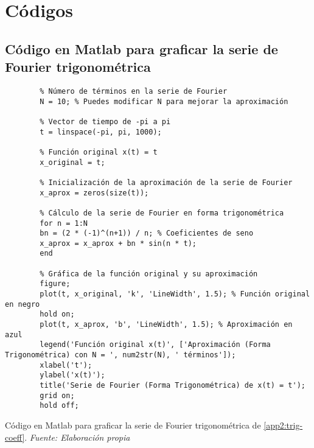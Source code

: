 \chapter{Códigos}\label{app3:Estado-del-arte-codes}

\section{Código en Matlab para graficar la serie de Fourier trigonométrica}\label{app3:trig-code-matlab}
\begin{longlisting}
	\begin{verbatim}
		% Número de términos en la serie de Fourier
		N = 10; % Puedes modificar N para mejorar la aproximación
		
		% Vector de tiempo de -pi a pi
		t = linspace(-pi, pi, 1000);
		
		% Función original x(t) = t
		x_original = t;
		
		% Inicialización de la aproximación de la serie de Fourier
		x_aprox = zeros(size(t));
		
		% Cálculo de la serie de Fourier en forma trigonométrica
		for n = 1:N
		bn = (2 * (-1)^(n+1)) / n; % Coeficientes de seno
		x_aprox = x_aprox + bn * sin(n * t);
		end
		
		% Gráfica de la función original y su aproximación
		figure;
		plot(t, x_original, 'k', 'LineWidth', 1.5); % Función original en negro
		hold on;
		plot(t, x_aprox, 'b', 'LineWidth', 1.5); % Aproximación en azul
		legend('Función original x(t)', ['Aproximación (Forma Trigonométrica) con N = ', num2str(N), ' términos']);
		xlabel('t');
		ylabel('x(t)');
		title('Serie de Fourier (Forma Trigonométrica) de x(t) = t');
		grid on;
		hold off;		
	\end{verbatim}
		\caption[Código en Matlab para graficar la serie de Fourier trigonométrica de \ref{app2:trig-coeff}.] {Código en Matlab para graficar la serie de Fourier trigonométrica de \ref{app2:trig-coeff}. \textit{Fuente: Elaboración propia}} 

\end{longlisting}

